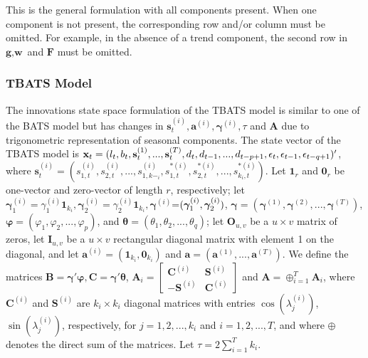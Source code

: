 \documentclass{uwstat572}
\begin{document}
\vspace{2mm} \noindent This is the general formulation with all components present. When one component is not present, the corresponding row and/or column must be omitted. For example, in the absence of a trend component, the second row in $\textbf{g}, \textbf{w}$ and $\textbf{F}$ must be omitted. 

\subsubsection{TBATS Model}
\hspace{4ex}The innovations state space formulation of the TBATS model is similar to one of the BATS model but has changes in $\textbf{s}_t^{(i)}, \textbf{a}^{(i)}, \bm{\gamma}^{(i)}, \tau$ and $\textbf{A}$ due to trigonometric representation of seasonal components. The state vector of the TBATS model is $\textbf{x}_t=(l_t,b_t,\textbf{s}_t^{(1)},...,\textbf{s}_t^{(T)}, d_t, d_{t-1},\\..., d_{t-p+1},  \epsilon_t, \epsilon_{t-1}, \epsilon_{t-q+1} )'$, 
where $\textbf{s}_t^{(i)}=(s_{1,t}^{(i)},s_{2,t}^{(i)},..., s_{1,k-_i}^{(i)}, s_{1,t}^{*(i)},s_{2,t}^{*(i)},...,s_{k_i,t}^{*(i)})$. 
Let $\textbf{1}_r$ and $\textbf{0}_r$ be one-vector and zero-vector of length $r$, respectively; let $\bm{\gamma}_1^{(i)}=\gamma_1^{(i)} \textbf{1}_{k_i}, \bm{\gamma}_2^{(i)}=\gamma_2^{(i)} \textbf{1}_{k_i}, \bm{\gamma}^{(i)}$=$(\bm{\gamma}_1^{(i)},\\ \bm{\gamma}_2^{(i)})$, $\bm{\gamma}=(\bm{\gamma}^{(1)},\bm{\gamma}^{(2)},...,\bm{\gamma}^{(T)})$, $\bm{\varphi}=(\varphi_1, \varphi_2,..., \varphi_p)$, and $\bm{\theta}=(\theta_1,\theta_2,...,\theta_q)$; let $\textbf{O}_{u,v}$ be a $u \times v$ matrix of zeros, let $\textbf{I}_{u,v}$ be a $u \times v$ rectangular diagonal matrix with element 1 on the diagonal, and let $\textbf{a}^{(i)}=(\textbf{1}_{k_i},\textbf{0}_{k_i})$ and $\textbf{a}=(\textbf{a}^{(1)},...,\textbf{a}^{(T)})$. We define the matrices $\textbf{B}=\bm{\gamma}'\bm{\varphi}, \textbf{C}=\bm{\gamma}'\bm{\theta}$, $\textbf{A}_i=\begin{bmatrix} 
\textbf{C}^{(i)} &\textbf{S}^{(i)}  \\ 
-\textbf{S}^{(i)}  &\textbf{C}^{(i)} 
\end{bmatrix}$ and $\textbf{A}=\oplus _{i=1}^T \textbf{A}_i$, where $\textbf{C}^{(i)}$ and $\textbf{S}^{(i)}$ are $k_i \times k_i$ diagonal matrices with entries $\cos (\lambda^{(i)}_j) $, $\sin (\lambda^{(i)}_j) $, respectively, for $j=1,2,...,k_i$ and $i=1,2,...,T$, and where $\oplus$ denotes the direct sum of the matrices. Let $\tau=2\sum_{i=1}^{T} k_i$. 
\end{document}

